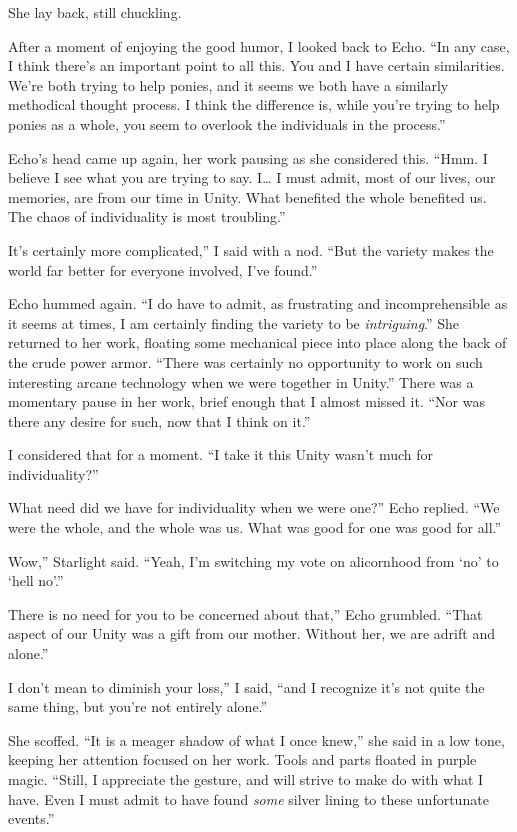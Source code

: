 She lay back, still chuckling.

After a moment of enjoying the good humor, I looked back to Echo. “In any case, I think there’s an important point to all this. You and I have certain similarities. We’re both trying to help ponies, and it seems we both have a similarly methodical thought process. I think the difference is, while you’re trying to help ponies as a whole, you seem to overlook the individuals in the process.”

Echo’s head came up again, her work pausing as she considered this. “Hmm. I believe I see what you are trying to say. I… I must admit, most of our lives, our memories, are from our time in Unity. What benefited the whole benefited us. The chaos of individuality is most troubling.”

\leavevmode{}It’s certainly more complicated,” I said with a nod. “But the variety makes the world far better for everyone involved, I’ve found.”

Echo hummed again. “I do have to admit, as frustrating and incomprehensible as it seems at times, I am certainly finding the variety to be \textit{intriguing}.” She returned to her work, floating some mechanical piece into place along the back of the crude power armor. “There was certainly no opportunity to work on such interesting arcane technology when we were together in Unity.” There was a momentary pause in her work, brief enough that I almost missed it. “Nor was there any desire for such, now that I think on it.”

I considered that for a moment. “I take it this Unity wasn’t much for individuality?”

\leavevmode{}What need did we have for individuality when we were one?” Echo replied. “We were the whole, and the whole was us. What was good for one was good for all.”

\leavevmode{}Wow,” Starlight said. “Yeah, I’m switching my vote on alicornhood from ‘no’ to ‘hell no’.”

\leavevmode{}There is no need for you to be concerned about that,” Echo grumbled. “That aspect of our Unity was a gift from our mother. Without her, we are adrift and alone.”

\leavevmode{}I don’t mean to diminish your loss,” I said, “and I recognize it’s not quite the same thing, but you’re not entirely alone.”

She scoffed. “It is a meager shadow of what I once knew,” she said in a low tone, keeping her attention focused on her work. Tools and parts floated in purple magic. “Still, I appreciate the gesture, and will strive to make do with what I have. Even I must admit to have found \textit{some} silver lining to these unfortunate events.”

